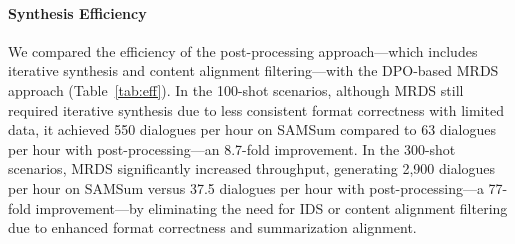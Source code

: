 

\paragraph{Synthesis Efficiency}
We compared the efficiency of the post-processing approach—which includes iterative synthesis and content alignment filtering—with the DPO-based MRDS approach (Table~\ref{tab:eff}). In the 100-shot scenarios, although MRDS still required iterative synthesis due to less consistent format correctness with limited data, it achieved 550 dialogues per hour on SAMSum compared to 63 dialogues per hour with post-processing—an 8.7-fold improvement. In the 300-shot scenarios, MRDS significantly increased throughput, generating 2,900 dialogues per hour on SAMSum versus 37.5 dialogues per hour with post-processing—a 77-fold improvement—by eliminating the need for IDS or content alignment filtering due to enhanced format correctness and summarization alignment.





